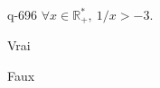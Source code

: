 \begin{truefalse}{q-696}
$\forall x \in \mathbb R^*_+,\: 1/x>-3$.
\item* Vrai
\item Faux
\end{truefalse}

